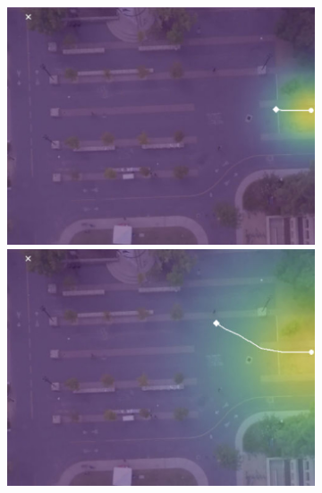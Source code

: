 \documentclass[letterpaper,10pt,conference]{ieeeconf}
\begin{document}
\begin{figure}[t!]
\begin{subfigure}[t]{0.48\textwidth}
	\vspace{0.1cm}
	\begin{minipage}[c]{0.47cm}
	\end{minipage}
	\begin{minipage}[c]{0.3\linewidth}
		\includegraphics[width=\linewidth]{./figures/bookstore/rand_1_2_t=50.jpg}
	\end{minipage}
	\begin{minipage}[c]{0.3\linewidth}
		\includegraphics[width=\linewidth]{./figures/bookstore/rand_1_2_t=130.jpg}
	\end{minipage}
	\begin{minipage}[c]{0.3\linewidth}

\end{minipage}
\end{subfigure}
\end{figure}
\end{document}
